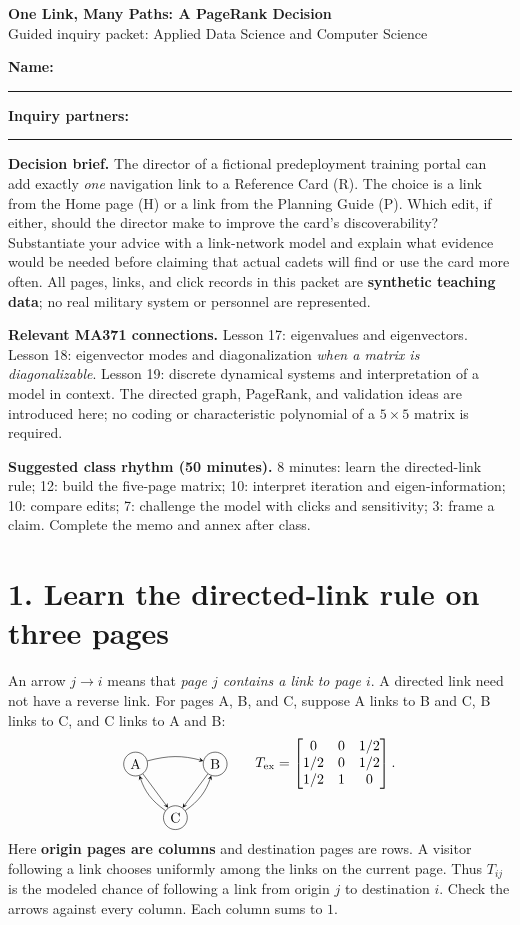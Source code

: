 \documentclass[10pt,letterpaper]{article}
\begin{document}
\begin{center}
{\Large\bfseries One Link, Many Paths: A PageRank Decision}\\[3pt]
{\large Guided inquiry packet: Applied Data Science and Computer Science}
\end{center}
\textbf{Name:} \rule{2.4in}{0.4pt}\hfill
\textbf{Inquiry partners:} \rule{2.25in}{0.4pt}

\textbf{Decision brief.} The director of a fictional predeployment training portal can add exactly \emph{one} navigation link to a Reference Card (R). The choice is a link from the Home page (H) or a link from the Planning Guide (P). Which edit, if either, should the director make to improve the card's discoverability? Substantiate your advice with a link-network model and explain what evidence would be needed before claiming that actual cadets will find or use the card more often. All pages, links, and click records in this packet are \textbf{synthetic teaching data}; no real military system or personnel are represented.



\textbf{Relevant MA371 connections.} Lesson 17: eigenvalues and eigenvectors. Lesson 18: eigenvector modes and diagonalization \emph{when a matrix is diagonalizable}. Lesson 19: discrete dynamical systems and interpretation of a model in context. The directed graph, PageRank, and validation ideas are introduced here; no coding or characteristic polynomial of a $5\times5$ matrix is required.

\textbf{Suggested class rhythm (50 minutes).} 8 minutes: learn the directed-link rule; 12: build the five-page matrix; 10: interpret iteration and eigen-information; 10: compare edits; 7: challenge the model with clicks and sensitivity; 3: frame a claim. Complete the memo and annex after class.

\section*{1. Learn the directed-link rule on three pages}
An arrow $j\to i$ means that \emph{page $j$ contains a link to page $i$}. A directed link need not have a reverse link. For pages A, B, and C, suppose A links to B and C, B links to C, and C links to A and B:
\[
\begin{tikzpicture}[baseline=-0.5ex,>=stealth,every node/.style={circle,draw,minimum size=6mm,inner sep=0pt}]
\node (a) at (0,0) {A}; \node (b) at (2,0) {B}; \node (c) at (1,-1.35) {C};
\draw[->] (a) to[bend left=15] (b);
\draw[->] (a) -- (c);
\draw[->] (b) -- (c);
\draw[->] (c) to[bend left=18] (a);
\draw[->] (c) to[bend right=18] (b);
\end{tikzpicture}
\qquad
T_{\rm ex}=\begin{bmatrix}
0&0&1/2\\ 1/2&0&1/2\\ 1/2&1&0
\end{bmatrix}.
\]
Here \textbf{origin pages are columns} and destination pages are rows. A visitor following a link chooses uniformly among the links on the current page. Thus $T_{ij}$ is the modeled chance of following a link from origin $j$ to destination $i$. Check the arrows against every column. Each column sums to $1$.
\end{document}
